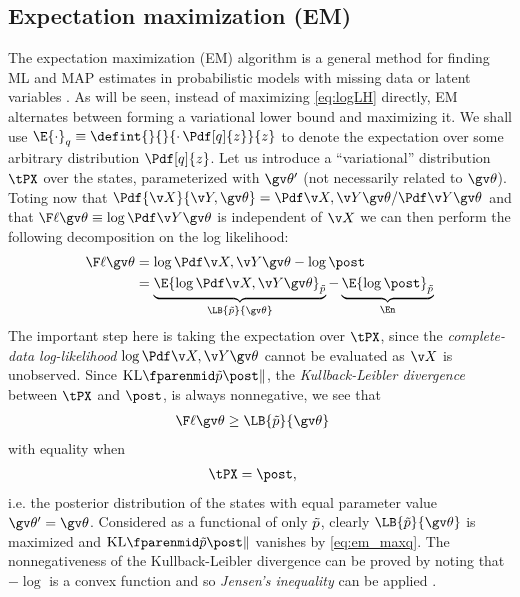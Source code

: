 \subsection{Expectation maximization (EM)}%

The expectation maximization (EM) algorithm \parencite{Dempster1977} is a general
method for finding ML and MAP estimates in probabilistic models with missing data or
latent variables \parencite{Bishop2006,barber2012bayesian}. As will be seen, instead of maximizing
\eqref{eq:logLH} directly, EM alternates between forming a variational lower bound and maximizing it.
We shall use $\E{\cdot}_{q}\equiv\defint{}{}{\cdot\,\Pdf[q]{z}}{z}$ to denote the expectation
over some arbitrary distribution $\Pdf[q]{z}$.
Let us introduce a ``variational'' 
distribution $\tPX$ over the states, parameterized with $\Th'$ (not necessarily related to $\Th$).
Toting now that $\Pdf{\X}{\Y,\Th}=\cLH/\LH$ and that $\lLH\equiv\log\LH$ is independent of $\X$ we can then perform the
following decomposition on the log likelihood:
\begin{align}
	\lLH &= \log\cLH - \log\post \nonumber\\
	&= \underbrace{\E{\log\cLH}_{\tP}}_{\LB{\tP}{\Th}} - \underbrace{\E{\log\post}_{\tP}}_{\En} \nonumber\\
	\label{eq:lLH_decomp}
\end{align}
The important step here is taking the expectation over $\tPX$, since the \emph{complete-data log-likelihood}
$\log\cLH$ cannot be evaluated as $\X$ is unobserved.
Since $\KL{\tP}{\post}$, the \emph{Kullback-Leibler divergence} between $\tPX$ and $\post$, is always nonnegative,
we see that 
\begin{align}
	\lLH&\geq \LB{\tP}{\Th} \label{eq:em_lh_lb}
\end{align}
with equality when 
\begin{align}
	\tPX &= \post, \label{eq:em_maxq}
\end{align}
i.e. the posterior distribution of the states with equal parameter value $\Th'=\Th$. Considered as a functional
of only $\tilde{p}$, clearly $\LB{\tP}{\Th}$ is maximized
and $\KL{\tP}{\post}$ vanishes by \eqref{eq:em_maxq}. 
The nonnegativeness of the Kullback-Leibler divergence can be proved by
noting that $-\log$ is a convex function and so \emph{Jensen's inequality}
can be applied \parencite{Bishop2006}.

